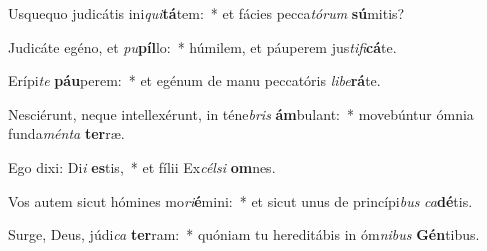 \item Usquequo judicátis ini\textit{qui}\textbf{tá}tem:~* et fácies pecca\textit{tó}\textit{rum} \textbf{sú}mitis?
\item Judicáte egéno, et \textit{pu}\textbf{píl}lo:~* húmilem, et páuperem jus\textit{ti}\textit{fi}\textbf{cá}te.
\item Erípi\textit{te} \textbf{páu}perem:~* et egénum de manu peccatóris \textit{li}\textit{be}\textbf{rá}te.
\item Nesciérunt, neque intellexérunt, in téne\textit{bris} \textbf{ám}bulant:~* movebúntur ómnia funda\textit{mén}\textit{ta} \textbf{ter}ræ.
\item Ego dixi: Di\textit{i} \textbf{es}tis,~* et fílii Ex\textit{cél}\textit{si} \textbf{om}nes.
\item Vos autem sicut hómines mo\textit{ri}\textbf{é}mini:~* et sicut unus de princípi\textit{bus} \textit{ca}\textbf{dé}tis.
\item Surge, Deus, júdi\textit{ca} \textbf{ter}ram:~* quóniam tu hereditábis in óm\textit{ni}\textit{bus} \textbf{Gén}tibus.
